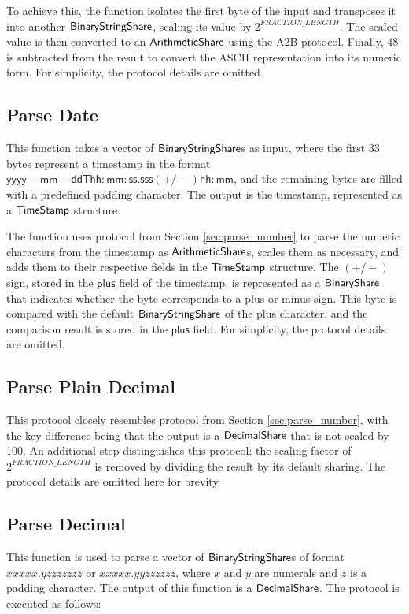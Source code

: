To achieve this, the function isolates the first byte of the input and transposes it into another ${\mathsf{BinaryStringShare}}$, scaling its value by $2^{FRACTION\_LENGTH}$. The scaled value is then converted to an ${\mathsf{ArithmeticShare}}$ using the A2B protocol. Finally, 48 is subtracted from the result to convert the ASCII representation into its numeric form. For simplicity, the protocol details are omitted.

\subsection{Parse Date}
\label{sec:parse_date}
This function takes a vector of ${\mathsf{BinaryStringShare}}$s as input, where the first 33 bytes represent a timestamp in the format $\mathsf{yyyy-mm-ddThh:mm:ss.sss(+/-)hh:mm}$, and the remaining bytes are filled with a predefined padding character. The output is the timestamp, represented as a ${\mathsf{TimeStamp}}$ structure.

The function uses protocol from Section \ref{sec:parse_number} to parse the numeric characters from the timestamp as ${\mathsf{ArithmeticShare}}$s, scales them as necessary, and adds them to their respective fields in the ${\mathsf{TimeStamp}}$ structure. The $(+/-)$ sign, stored in the $\mathsf{plus}$ field of the timestamp, is represented as a ${\mathsf{BinaryShare}}$ that indicates whether the byte corresponds to a plus or minus sign. This byte is compared with the default ${\mathsf{BinaryStringShare}}$ of the plus character, and the comparison result is stored in the $\mathsf{plus}$ field. For simplicity, the protocol details are omitted.

\subsection{Parse Plain Decimal}
\label{sec:parse_plain_decimal}

This protocol closely resembles protocol from Section \ref{sec:parse_number}, with the key difference being that the output is a ${\mathsf{DecimalShare}}$ that is not scaled by 100. An additional step distinguishes this protocol: the scaling factor of $2^{FRACTION\_LENGTH}$ is removed by dividing the result by its default sharing. The protocol details are omitted here for brevity.

\subsection{Parse Decimal}
\label{sec:parse_decimal}

This function is used to parse a vector of ${\mathsf{BinaryStringShare}}$s of format \\$xxxxx.yzzzzzzz$ or $xxxxx.yyzzzzzz$, where $x$ and $y$ are numerals and $z$ is a padding character. The output of this function is a ${\mathsf{DecimalShare}}$. The protocol is executed as follows:

